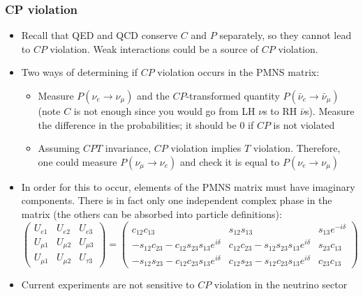 \documentclass[11pt]{article}
\newcommand{\nubar}{{\bar{\nu}}}
\begin{document}
\subsubsection{CP violation}
\begin{itemize}
  \item Recall that QED and QCD conserve $C$ and $P$ separately, so they cannot lead to $CP$ violation. Weak interactions could be a source of $CP$ violation.
  \item Two ways of determining if $CP$ violation occurs in the PMNS matrix:
  \begin{itemize}
    \item Measure $P(\nu_e\rightarrow\nu_\mu)$ and the $CP$-transformed quantity $P(\nubar_e\rightarrow\nubar_\mu)$ (note $C$ is not enough since you would go from LH $\nu$s to RH $\nubar$s). Measure the difference in the probabilities; it should be $0$ if $CP$ is not violated
    \item Assuming $CPT$ invariance, $CP$ violation implies $T$ violation. Therefore, one could measure $P(\nu_\mu\rightarrow \nu_e)$ and check it is equal to $P(\nu_e\rightarrow\nu_\mu)$
  \end{itemize}
  \item In order for this to occur, elements of the PMNS matrix must have imaginary components. There is in fact only one independent complex phase in the matrix (the others can be absorbed into particle definitions):
  \begin{equation}
    \begin{pmatrix} 
      U_{e1} & U_{e2} & U_{e3} \\
      U_{\mu1} & U_{\mu2} & U_{\mu3} \\
      U_{\mu1} & U_{\mu2} & U_{\tau3} 
    \end{pmatrix} = 
    \begin{pmatrix} 
      c_{12}c_{13} & s_{12}s_{13} & s_{13}e^{-i\delta} \\
      -s_{12}c_{23}-c_{12}s_{23}s_{13}e^{i\delta} & c_{12}c_{23}-s_{12}s_{23}s_{13}e^{i\delta} & s_{23}c_{13}\\
      -s_{12}s_{23}-c_{12}c_{23}s_{13}e^{i\delta} & c_{12}s_{23}-s_{12}c_{23}s_{13}e^{i\delta} & c_{23}c_{13}
    \end{pmatrix}   
  \end{equation}
  \item Current experiments are not sensitive to $CP$ violation in the neutrino sector
\end{itemize}
\end{document}
